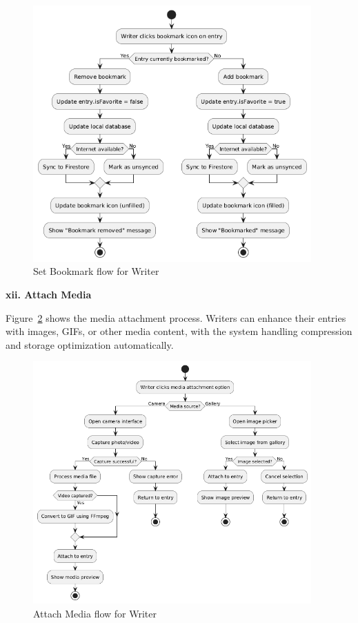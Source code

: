 \begin{figure}[H]
\centering
\includegraphics[width=0.95\textwidth,height=0.7\textheight,keepaspectratio]{files/imgs/set_bookmark_flow.png}
\caption{Set Bookmark flow for Writer}
\label{fig:set-bookmark-flow}
\end{figure}
\clearpage

\textbf{xii. Attach Media}


Figure~\ref{fig:attach-media-flow} shows the media attachment process. Writers can enhance their entries with images, GIFs, or other media content, with the system handling compression and storage optimization automatically.

\begin{figure}[H]
\centering
\includegraphics[width=0.95\textwidth,height=0.7\textheight,keepaspectratio]{files/imgs/attach_media_flow.png}
\caption{Attach Media flow for Writer}
\label{fig:attach-media-flow}
\end{figure}
\clearpage

